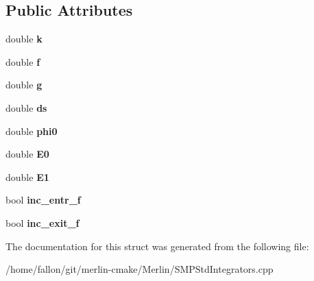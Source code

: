 \subsection*{Public Attributes}
\begin{DoxyCompactItemize}
\item 
\mbox{\label{structSMPTracking_1_1ApplyTWRF_a8dbba77286fd250c51dbd3a76b550cb0}} 
double {\bfseries k}
\item 
\mbox{\label{structSMPTracking_1_1ApplyTWRF_a1fa3592a049b57a7e3ebc26a3684325c}} 
double {\bfseries f}
\item 
\mbox{\label{structSMPTracking_1_1ApplyTWRF_af5239379abf1e8dbf5e5f9fe85c9fcbb}} 
double {\bfseries g}
\item 
\mbox{\label{structSMPTracking_1_1ApplyTWRF_a508525ec748bfbdc10bc367eb1bdfe55}} 
double {\bfseries ds}
\item 
\mbox{\label{structSMPTracking_1_1ApplyTWRF_a1ed9a769114767fc5867bf36a36f278a}} 
double {\bfseries phi0}
\item 
\mbox{\label{structSMPTracking_1_1ApplyTWRF_a0911f6b721e3f200d5efa131ca52c50c}} 
double {\bfseries E0}
\item 
\mbox{\label{structSMPTracking_1_1ApplyTWRF_aa860dd9e421784177f86e09a6b6f0e82}} 
double {\bfseries E1}
\item 
\mbox{\label{structSMPTracking_1_1ApplyTWRF_aa00b3a8df0f94365d7084f214bc59afa}} 
bool {\bfseries inc\+\_\+entr\+\_\+f}
\item 
\mbox{\label{structSMPTracking_1_1ApplyTWRF_a95e76c0754acfdc2e902137f56c1b191}} 
bool {\bfseries inc\+\_\+exit\+\_\+f}
\end{DoxyCompactItemize}


The documentation for this struct was generated from the following file\+:\begin{DoxyCompactItemize}
\item 
/home/fallon/git/merlin-\/cmake/\+Merlin/S\+M\+P\+Std\+Integrators.\+cpp\end{DoxyCompactItemize}
